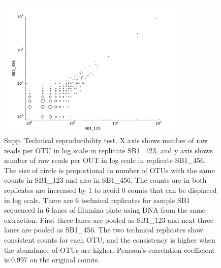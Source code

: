 \documentclass[12pt]{article}
\begin{document}
\begin{figure}[tbph!]
  \centering
  \includegraphics[width=0.8\textwidth]{figs/SB1_techrep_OTUscat}
  \caption[Technical reproducibility test]{Supp. Technical reproducibility test. X axis shows number of raw reads per OTU in log scale in replicate SB1\_123, and y axis shows number of raw reads per OUT in log scale in replicate SB1\_456. The size of circle is proportional to number of OTUs with the same counts in SB1\_123 and also in SB1\_456. The counts are in both replicates are increased by 1 to avoid 0 counts that can be displaced in log scale. There are 6 technical replicates for sample SB1 sequenced in 6 lanes of Illumina plate using DNA from the same extraction. First three lanes are pooled as SB1\_123 and next three lanes are pooled as SB1\_456. The two technical replicates show consistent counts for each OTU, and the consistency is higher when the abundance of OTUs are higher. Pearson’s correlation coefficient is 0.997 on the original counts.}
  \label{fig:SB1_techrep_OTUscat}
\end{figure}
\end{document}

